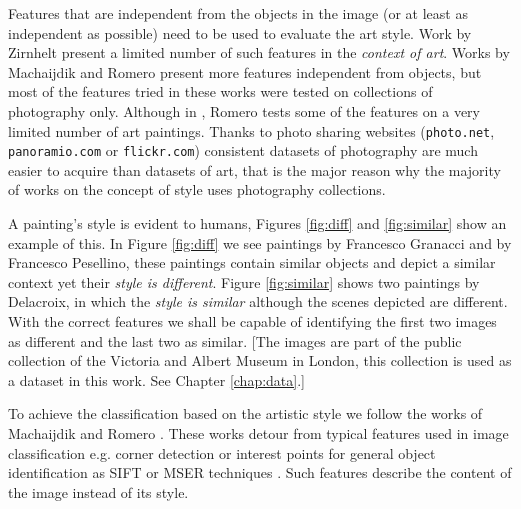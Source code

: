 \documentclass[11pt,a4paper,twoside,openright]{report}
\begin{document}
Features that are independent from the objects in the image (or at least as
independent as possible) need to be used to evaluate the art style.  Work by
Zirnhelt \cite{zirnhelt07art} present a limited number of such features in the
\emph{context of art}.  Works by Machaijdik \cite{mach10clas} and Romero
\cite{rmc12ajs} present more features independent from objects, but most of the
features tried in these works were tested on collections of photography only.
Although in \cite{rmc12ajs}, Romero tests some of the features on a very
limited number of art paintings.  Thanks to photo sharing websites
(\texttt{photo.net}, \texttt{panoramio.com} or \texttt{flickr.com}) consistent
datasets of photography are much easier to acquire than datasets of art, that
is the major reason why the majority of works on the concept of style uses
photography collections.

A painting's style is evident to humans, Figures \ref{fig:diff} and
\ref{fig:similar} show an example of this.  In Figure \ref{fig:diff} we see
paintings by Francesco Granacci and by Francesco Pesellino, these paintings
contain similar objects and depict a similar context yet their \emph{style is
different}.  Figure \ref{fig:similar} shows two paintings by Delacroix, in
which the \emph{style is similar} although the scenes depicted are different.
With the correct features we shall be capable of identifying the first two
images as different and the last two as similar.  [The images are part of the
public collection of the Victoria and Albert Museum in London, this collection
is used as a dataset in this work.  See Chapter \ref{chap:data}.]

To achieve the classification based on the artistic style we follow the works
of Machaijdik \cite{mach10clas} and Romero \cite{rmc12ajs}.  These works detour
from typical features used in image classification e.g.  corner detection or
interest points for general object identification as SIFT or MSER techniques
\cite{szel11book}.  Such features describe the content of the image instead of
its style.
\end{document}
